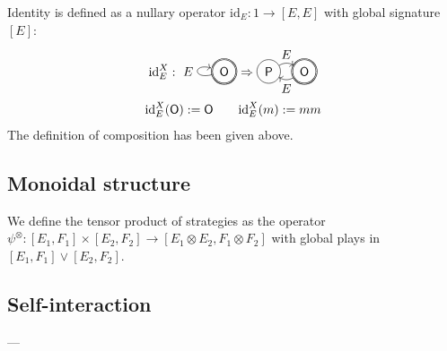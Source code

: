 \documentclass[format=sigplan,authordraft]{acmart}
\newcommand{\kw}[1]{\ensuremath{ \mathsf{#1} }}
\begin{document}
Identity is defined as a nullary operator
$\mathrm{id}_E : 1 \rightarrow [E,E]$
with global signature $[E]$:
\begin{gather*}
  \mathrm{id}_E^X :
  \begin{tikzpicture}[baseline=(O.base)]
    \node[circle,draw,double] (O) at (0,0) {$\kw{O}$};
    \path[->] (O) edge[loop left] node[auto] {$E$} (O);
  \end{tikzpicture}
  \Rightarrow
  \begin{tikzpicture}[baseline=(O.base)]
    \node[circle,draw,double] (O) at (1,0) {$\kw{O}$};
    \node[circle,draw] (P) at (0,0) {$\kw{P}$};
    \path[->] (O) edge[bend left] node[below] {$E$} (P);
    \path[->] (P) edge[bend left] node[above] {$E$} (O);
  \end{tikzpicture}
  \\
  \mathrm{id}_E^X(\kw{O}) := \kw{O}
  \qquad
  \mathrm{id}_E^X(m) := mm
\end{gather*}
The definition of composition has been given above.


\subsection{Monoidal structure} %

We define the tensor product of strategies
as the operator
$\psi^{\otimes} : [E_1,F_1] \times [E_2,F_2] \rightarrow
 [E_1 \otimes E_2, F_1 \otimes F_2]$
with global plays in
$[E_1,F_1] \vee [E_2,F_2]$.


\subsection{Self-interaction} %




---
\end{document}
